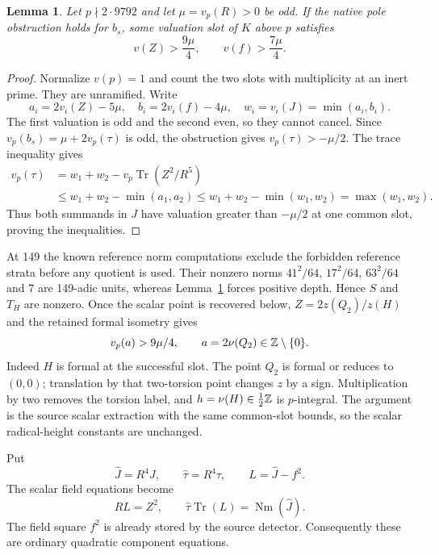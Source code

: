 \documentclass[11pt]{article}
\newtheorem{lemma}[theorem]{Lemma}
\theoremstyle{remark}\newtheorem{remark}[theorem]{Remark}
\newcommand{\Tr}{\operatorname{Tr}}\newcommand{\Nm}{\operatorname{Nm}}
\begin{document}
\begin{lemma}\label{lem:scalar}
Let $p\nmid2\cdot9792$ and let $\mu=v_p(R)>0$ be odd. If the
native pole obstruction holds for $b_s$, some valuation slot of
$K$ above $p$ satisfies
\[
             v(Z)>\frac{9\mu}{4},\qquad
             v(f)>\frac{7\mu}{4}.
\]
\end{lemma}
\begin{proof}
Normalize $v(p)=1$ and count the two slots with multiplicity at
an inert prime. They are unramified. Write
\[
 a_i=2v_i(Z)-5\mu,\quad b_i=2v_i(f)-4\mu,\quad
 w_i=v_i(J)=\min(a_i,b_i).
\]
The first valuation is odd and the second even, so they cannot
cancel. Since $v_p(b_s)=\mu+2v_p(\tau)$ is odd, the obstruction
gives $v_p(\tau)>-\mu/2$. The trace inequality gives
\begin{align*}
 v_p(\tau)
 &=w_1+w_2-v_p\Tr(Z^2/R^5)\\
 &\le w_1+w_2-\min(a_1,a_2)
 \le w_1+w_2-\min(w_1,w_2)=\max(w_1,w_2).
\end{align*}
Thus both summands in $J$ have valuation greater than $-\mu/2$
at one common slot, proving the inequalities.
\end{proof}

At 149 the known reference norm computations exclude the
forbidden reference strata before any quotient is used. Their
nonzero norms $41^2/64$, $17^2/64$, $63^2/64$ and $7$ are
149-adic units, whereas Lemma~\ref{lem:scalar} forces positive
depth. Hence $S$ and $T_H$ are nonzero. Once the scalar point
is recovered below, $Z=2z(Q_2)/z(H)$ and the retained formal
isometry gives
\begin{equation}\label{eq:scalarindex}
                         v_p(a)>9\mu/4,
 \qquad a=2\nu(Q_2)\in\mathbb Z\setminus\{0\}.
\end{equation}
Indeed $H$ is formal at the successful slot. The point $Q_2$
is formal or reduces to $(0,0)$; translation by that two-torsion
point changes $z$ by a sign. Multiplication by two removes the
torsion label, and $h=\nu(H)\in\frac12\mathbb Z$ is $p$-integral.
The argument is the source scalar extraction with the same
common-slot bounds, so the scalar radical-height constants are
unchanged.

Put
\[
 \widehat J=R^4J,\qquad \widehat\tau=R^4\tau,
 \qquad L=\widehat J-f^2.
\]
The scalar field equations become
\begin{equation}\label{eq:scalarquadratic}
                 RL=Z^2,\qquad
                 \widehat\tau\Tr(L)=\Nm(\widehat J).
\end{equation}
The field square $f^2$ is already stored by the source detector.
Consequently these are ordinary quadratic component equations.
\end{document}
